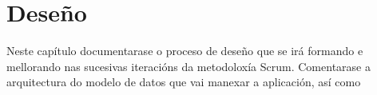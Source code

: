 \chapter{Deseño}

Neste capítulo documentarase o proceso de deseño que se irá formando e mellorando nas sucesivas iteracións da metodoloxía Scrum. Comentarase a arquitectura do modelo de datos que vai manexar a aplicación, así como

